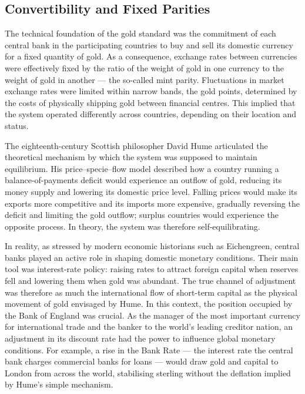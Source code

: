 \subsection{Convertibility and Fixed Parities}
The technical foundation of the gold standard was the commitment of each central bank in the participating countries to buy and sell its domestic currency for a fixed quantity of gold. As a consequence, exchange rates between currencies were effectively fixed by the ratio of the weight of gold in one currency to the weight of gold in another --- the so-called mint parity. Fluctuations in market exchange rates were limited within narrow bands, the gold points, determined by the costs of physically shipping gold between financial centres. This implied that the system operated differently across countries, depending on their location and status.
 
The eighteenth-century Scottish philosopher David Hume articulated the theoretical mechanism by which the system was supposed to maintain equilibrium. His price–specie–flow model described how a country running a balance-of-payments deficit would experience an outflow of gold, reducing its money supply and lowering its domestic price level. Falling prices would make its exports more competitive and its imports more expensive, gradually reversing the deficit and limiting the gold outflow; surplus countries would experience the opposite process. In theory, the system was therefore self-equilibrating.
 
In reality, as stressed by modern economic historians such as Eichengreen, central banks played an active role in shaping domestic monetary conditions. Their main tool was interest-rate policy: raising rates to attract foreign capital when reserves fell and lowering them when gold was abundant. The true channel of adjustment was therefore as much the international flow of short-term capital as the physical movement of gold envisaged by Hume. In this context, the position occupied by the Bank of England was crucial. As the manager of the most important currency for international trade and the banker to the world's leading creditor nation, an adjustment in its discount rate had the power to influence global monetary conditions. For example, a rise in the Bank Rate --- the interest rate the central bank charges commercial banks for loans --- would draw gold and capital to London from across the world, stabilising sterling without the deflation implied by Hume's simple mechanism.
 
